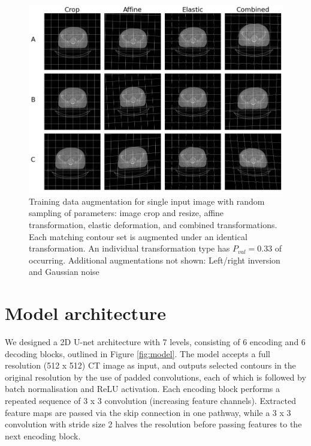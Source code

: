 \begin{figure}[!htb]
	\begin{center}
		\includegraphics[width=1\textwidth]{figures/augment}
		\caption{Training data augmentation for single input image with random sampling of parameters: image crop and resize, affine transformation, elastic deformation, and combined transformations. Each matching contour set is augmented under an identical transformation. An individual transformation type has $P_{val}=0.33$ of occurring. Additional augmentations not shown: Left/right inversion and Gaussian noise}
		\label{fig:augment}
	\end{center}
\end{figure}

\section{Model architecture}
\label{ch:method-architecture}
We
designed a 2D U-net architecture with 7 levels, consisting of 6 encoding and 6 decoding blocks, outlined in Figure \ref{fig:model}. The model accepts a full resolution (512 x 512) CT image as input, and outputs selected contours in the original resolution by the use of padded convolutions, each of which is followed by batch normalisation and ReLU activation. Each encoding block performs a repeated sequence of 3 x 3 convolution (increasing feature channels). Extracted feature maps are passed via the skip connection in one pathway, while a 3 x 3 convolution with stride size 2 halves
the resolution before passing features to the next encoding block.

